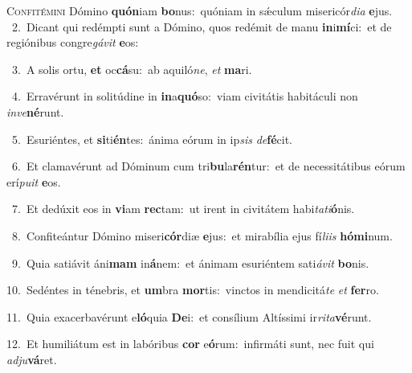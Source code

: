 \lettrine{\initial\textcolor{\initialcolor}{C}}{onfitémini} Dómino \textbf{quón}\-iam \textbf{bo}\-nus:~\star quóniam in sǽculum misericór\-\textit{di}\-\textit{a} \textbf{e}\-jus.\\
{\numbfont\textcolor{\numbcolor}{~2.}}~Dicant qui redémpti sunt a Dómino, quos redémit de manu \textbf{in}\-i\-\textbf{mí}\-ci:~\star et de regiónibus congre\-\textit{gá}\-\textit{vit} \textbf{e}\-os:\par
{\numbfont\textcolor{\numbcolor}{~3.}}~A solis ortu, \textbf{et} oc\-\textbf{cá}\-su:~\star ab aquiló\-\textit{ne}\-, \textit{et} \textbf{ma}\-ri.\par
{\numbfont\textcolor{\numbcolor}{~4.}}~Erravérunt in solitúdine in \textbf{in}\-a\-\textbf{quó}\-so:~\star viam civitátis habitáculi non \textit{in}\-\textit{ve}\textbf{né}runt.\par
{\numbfont\textcolor{\numbcolor}{~5.}}~Esuriéntes, et \textbf{si}\-ti\-\textbf{én}\-tes:~\star ánima eórum in ip\textit{sis} \textit{de}\-\textbf{fé}cit.\par
{\numbfont\textcolor{\numbcolor}{~6.}}~Et clamavérunt ad Dóminum cum tri\-\textbf{bu}\-la\-\textbf{rén}\-tur:~\star et de necessitátibus eórum erí\-\textit{pu}\-\textit{it} \textbf{e}\-os.\par
{\numbfont\textcolor{\numbcolor}{~7.}}~Et dedúxit eos in \textbf{vi}\-am \textbf{rec}\-tam:~\star ut irent in civitátem habi\-\textit{ta}\-\textit{ti}\textbf{ó}nis.\par
{\numbfont\textcolor{\numbcolor}{~8.}}~Confiteántur Dómino miseri\-\textbf{cór}\-diæ \textbf{e}\-jus:~\star et mirabília ejus fí\-\textit{li}\-\textit{is} \textbf{hó}\-\textbf{mi}num.\par
{\numbfont\textcolor{\numbcolor}{~9.}}~Quia satiávit áni\textbf{mam} in\-\textbf{á}\-nem:~\star et ánimam esuriéntem sati\-\textit{á}\-\textit{vit} \textbf{bo}\-nis.\par
{\numbfont\textcolor{\numbcolor}{10.}}~Sedéntes in ténebris, et \textbf{um}\-bra \textbf{mor}\-tis:~\star vinctos in mendicitá\textit{te} \textit{et} \textbf{fer}\-ro.\par
{\numbfont\textcolor{\numbcolor}{11.}}~Quia exacerbavérunt e\-\textbf{ló}\-quia \textbf{De}\-i:~\star et consílium Altíssimi ir\-\textit{ri}\-\textit{ta}\textbf{vé}runt.\par
{\numbfont\textcolor{\numbcolor}{12.}}~Et humiliátum est in labóribus \textbf{cor} e\-\textbf{ó}\-rum:~\star infirmáti sunt, nec fuit qui \textit{ad}\-\textit{ju}\textbf{vá}ret.\par
